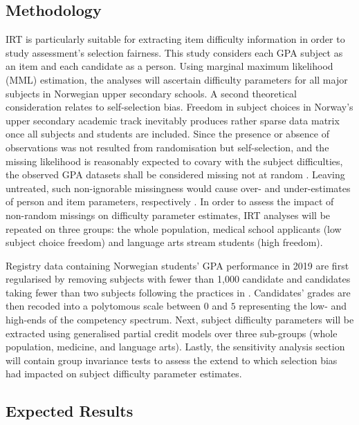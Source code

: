 \subsection{Methodology}

IRT is particularly suitable for extracting item difficulty information in order to study assessment's selection fairness. This study considers each GPA subject as an item and each candidate as a person. Using marginal maximum likelihood (MML) estimation, the analyses will ascertain difficulty parameters for all major subjects in Norwegian upper secondary schools. A second theoretical consideration relates to self-selection bias. Freedom in subject choices in Norway's upper secondary academic track inevitably produces rather sparse data matrix once all subjects and students are included. Since the presence or absence of observations was not resulted from randomisation but self-selection, and the missing likelihood is reasonably expected to covary with the subject difficulties, the observed GPA datasets shall be considered missing not at random \parencite[MNAR,][]{rubin:1976}. Leaving untreated, such non-ignorable missingness would cause over- and under-estimates of person and item parameters, respectively \parencite{rose:2013}. In order to assess the impact of non-random missings on difficulty parameter estimates, IRT analyses will be repeated on three groups: the whole population, medical school applicants (low subject choice freedom) and language arts stream students (high freedom).

Registry data containing Norwegian students' GPA performance in 2019 are first regularised by removing subjects with fewer than 1,000 candidate and candidates taking fewer than two subjects following the practices in \textcite{he:2018}. Candidates' grades are then recoded into a polytomous scale between $0$ and $5$ representing the low- and high-ends of the competency spectrum. Next, subject difficulty parameters will be extracted using generalised partial credit models \parencite[GPCM,][]{muraki:1992} over three sub-groups (whole population, medicine, and language arts). Lastly, the sensitivity analysis section will contain group invariance tests to assess the extend to which selection bias had impacted on subject difficulty parameter estimates.

\subsection{Expected Results}

